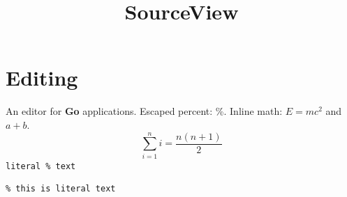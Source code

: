 \documentclass{article}
\title{SourceView}
\begin{document}
\maketitle
\section{Editing}
An editor for \textbf{Go} applications. Escaped percent: \%.
Inline math: $E = mc^2$ and \(a + b\).
\begin{equation}
  \sum_{i=1}^{n} i = \frac{n(n+1)}{2}
\end{equation}
\verb|literal % text|
\begin{verbatim}
% this is literal text
\end{verbatim}
\end{document}
